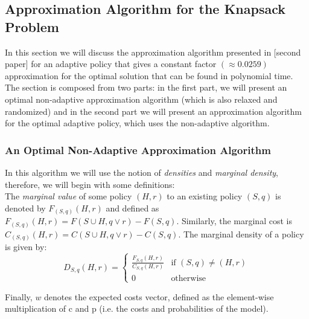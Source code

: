 \subsection{Approximation Algorithm for the Knapsack Problem}\label{sec:knapsack}
In this section we will discuss the approximation algorithm presented in [second paper] for an adaptive policy that gives a constant factor $ (\approx 0.0259)$ approximation for the optimal solution that can be found in polynomial time. The section is composed from two parts: in the first part, we will present an optimal non-adaptive approximation algorithm (which is also relaxed and randomized) and in the second part we will present an approximation algorithm for the optimal adaptive policy, which uses the non-adaptive algorithm.
\subsubsection{An Optimal Non-Adaptive Approximation Algorithm}
In this algorithm we will use the notion of \textit{densities} and \textit{marginal density}, therefore, we will begin with some definitions:
\\The \textit{marginal value} of some policy $(H, r)$ to an existing policy $(S, q)$ is denoted by $F_{(S,q)}(H, r)$ and defined as $F_{(S,q)}(H, r) = F(S \cup H, q \vee r) − F(S, q)$. Similarly, the marginal cost is $C_{(S,q)}(H, r) = C(S \cup H, q \vee r) − C(S, q)$. The marginal density of a policy is given by: 
\[
    D_{S,q}(H, r) = 
\begin{cases}
    \frac{F_{S,q}(H, r)}{C_{S,q}(H, r)}& \text{if } (S, q) \neq (H, r)\\
    0              & \text{otherwise}
\end{cases}
\]

Finally, $w$ denotes the expected costs vector, defined as the element-wise multiplication of c and p (i.e. the costs and probabilities of the model).

